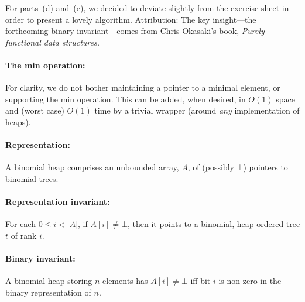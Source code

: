 \documentclass[a4paper]{article}
\newcommand{\any}{{\rule[-.2ex]{1ex}{.4pt}}}	%
\begin{document}
\begin{enumerate}[a)]
%	
%	
	
\end{enumerate}
For parts~(d) and~(e), we decided to deviate slightly from the exercise sheet in order to present a lovely algorithm.
Attribution:
The key insight---the forthcoming binary invariant---comes from Chris Okasaki's book, \emph{Purely functional data structures.}

\paragraph{The min operation:}
For clarity, we do not bother maintaining a pointer to a minimal element, or supporting the min operation.
This can be added, when desired, in $O(1)$ space and (worst case) $O(1)$ time by a trivial wrapper (around \emph{any} implementation of heaps).

\paragraph{Representation:}
A binomial heap comprises an unbounded array, $A$, of (possibly $\bot$) pointers to binomial trees.

\paragraph{Representation invariant:}
For each $0 \le i < |A|$, if $A[i] \not= \bot$, then it points to a binomial, heap-ordered tree $t$ of rank $i$.

\paragraph{Binary invariant:}
A binomial heap storing $n$ elements has $A[i] \not= \bot$ iff bit $i$ is non-zero in the binary representation of $n$.
\end{document}
